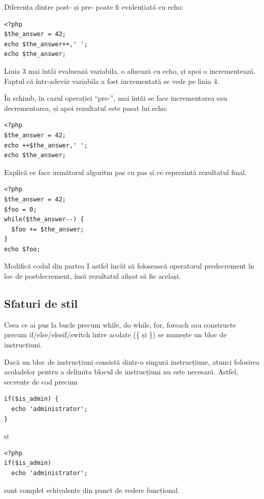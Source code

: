 Diferența dintre post- și pre- poate fi evidențiată cu echo:
\begin{lstlisting}
<?php
$the_answer = 42;
echo $the_answer++,' ';
echo $the_answer;
\end{lstlisting}
Linia 3 mai întâi evaluează variabila, o afișează cu echo, și apoi
o incrementează. Faptul că într-adevăr variabila a fost incrementată
se vede pe linia 4.

În schimb, în cazul operației ``pre-'', mai întâi se face incrementarea sau decrementarea,
și apoi rezultatul este pasat lui echo:
\begin{lstlisting}
<?php
$the_answer = 42;
echo ++$the_answer,' ';
echo $the_answer;
\end{lstlisting}

\begin{Exercise}[title={Decrementarea într-o buclă},difficulty=1]
\ExePart
Explică ce face următorul algoritm pas cu pas și ce reprezintă rezultatul final.
\begin{lstlisting}
<?php
$the_answer = 42;
$foo = 0;
while($the_answer--) {
  $foo += $the_answer;
}
echo $foo;
\end{lstlisting}
\ExePart
Modifică codul din partea I astfel încât să folosească operatorul predecrement în loc de postdecrement,
însă rezultatul afișat să fie același.
\end{Exercise}

\subsection{Sfaturi de stil}
Ceea ce ai pus la bucle precum while, do while, for, foreach sau constructe
precum if/else/elseif/switch între acolate (\{ și \}) se numește un bloc de instrucțiuni.

Dacă un bloc de instrucțiuni consistă dintr-o singură instrucțiune, atunci folosirea
acoladelor pentru a delimita blocul de instrucțiuni nu este necesară. Astfel, secvențe
de cod precum
\begin{lstlisting}
if($is_admin) {
  echo 'administrator';
}
\end{lstlisting}
și
\begin{lstlisting}
<?php
if($is_admin)
  echo 'administrator';
\end{lstlisting}
sunt complet echivalente din punct de vedere funcțional.


